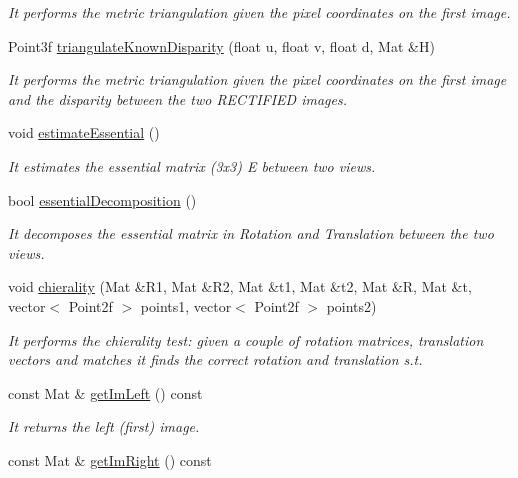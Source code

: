 \begin{DoxyCompactItemize}
\begin{DoxyCompactList}\small\item\em It performs the metric triangulation given the pixel coordinates on the first image. \end{DoxyCompactList}\item 
Point3f \hyperlink{classStereoCamera_a761ea623c4cde38b4fa1d798ef09b7ae}{triangulate\+Known\+Disparity} (float u, float v, float d, Mat \&H)
\begin{DoxyCompactList}\small\item\em It performs the metric triangulation given the pixel coordinates on the first image and the disparity between the two R\+E\+C\+T\+I\+F\+I\+ED images. \end{DoxyCompactList}\item 
void \hyperlink{classStereoCamera_ab2eded08bca185ac22cd6343cb4c85c8}{estimate\+Essential} ()
\begin{DoxyCompactList}\small\item\em It estimates the essential matrix (3x3) E between two views. \end{DoxyCompactList}\item 
bool \hyperlink{classStereoCamera_a180388e93b654802c7c56c18d206214b}{essential\+Decomposition} ()
\begin{DoxyCompactList}\small\item\em It decomposes the essential matrix in Rotation and Translation between the two views. \end{DoxyCompactList}\item 
void \hyperlink{classStereoCamera_aefb25fc2ecd8d0ce484e5981769dd635}{chierality} (Mat \&R1, Mat \&R2, Mat \&t1, Mat \&t2, Mat \&R, Mat \&t, vector$<$ Point2f $>$ points1, vector$<$ Point2f $>$ points2)
\begin{DoxyCompactList}\small\item\em It performs the chierality test\+: given a couple of rotation matrices, translation vectors and matches it finds the correct rotation and translation s.\+t. \end{DoxyCompactList}\item 
const Mat \& \hyperlink{classStereoCamera_a60d38071129c2b25ac38bb0afcecacf8}{get\+Im\+Left} () const 
\begin{DoxyCompactList}\small\item\em It returns the left (first) image. \end{DoxyCompactList}\item 
const Mat \& \hyperlink{classStereoCamera_a62661f0eece14a042114dbef099d8743}{get\+Im\+Right} () const 

\end{DoxyCompactItemize}
